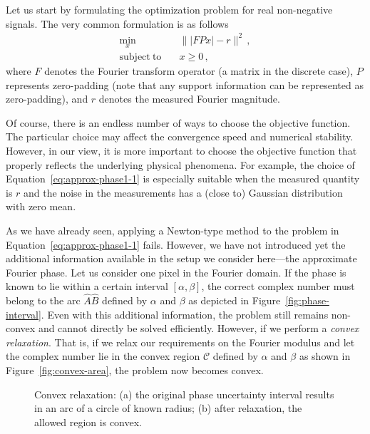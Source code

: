 Let us start by formulating the optimization problem for real
non-negative signals. The very common formulation is as follows
\begin{equation}
  \label{eq:approx-phase1-1}
  \begin{split}
    \min_{x} &\quad \||FPx| - r\|^{2} \,,   \\
    \mathrm{subject\ to} &\quad x\geq 0 \,, 
  \end{split}
\end{equation}
where $F$ denotes the Fourier transform operator (a matrix in the discrete case),
$P$ represents zero-padding (note that any support information can be
represented as zero-padding), and $r$ denotes the measured Fourier
magnitude. 

Of
course, there is an endless number of ways to choose the objective
function. The particular choice  may affect the convergence speed
and numerical stability. However, in our view, it is more important to
choose the objective function that properly reflects the underlying
physical phenomena. For example, the choice of
Equation~\eqref{eq:approx-phase1-1} is especially suitable when the
measured quantity is $r$ and the noise in the measurements has
a (close to) Gaussian distribution with zero mean.

As we have already seen, applying a Newton-type method to the problem
in Equation~\eqref{eq:approx-phase1-1} fails. However, we have not
introduced yet the additional information available in the
setup we consider here---the approximate Fourier phase. Let us consider one
pixel in the Fourier domain.  If the phase is known to lie within
a certain interval $[\alpha,\beta]$, the correct complex number must
belong to the arc $\hat{A}\hat{B}$ defined by $\alpha$ and $\beta$ as
depicted in Figure~\ref{fig:phase-interval}. Even with this additional
information, the problem still remains non-convex and cannot directly be solved
efficiently. However, if we perform a \emph{convex relaxation}. That
is, if we relax our requirements on the Fourier modulus and let the
complex number lie in the convex region $\mathcal{C}$ defined by
$\alpha$ and $\beta$ as shown in Figure~\ref{fig:convex-area}, the
problem now becomes convex.
\begin{figure}[H]
  \centering
  \qquad%
  \caption[Convex relaxation of phase bounds]{Convex relaxation: (a)
    the original phase uncertainty interval results in an arc of a
    circle of known radius; (b) after relaxation, the allowed region
    is convex.}
  \label{fig:convex}
\end{figure}

